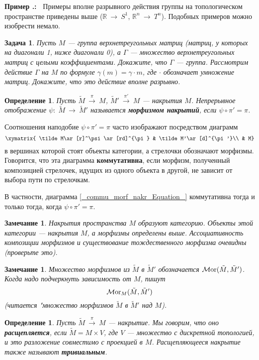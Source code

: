 \documentclass[12pt]{book}
\newcommand{\arrow}{{\:\longrightarrow\:}}
\newcommand{\Mor}{\operatorname{{\cal M}or}}
\def\R{{\mathbb R}}
\theoremstyle{upshape}
\newtheorem{zadacha}{Задача}[chapter]
\theoremstyle{generic}
\newtheorem{opredelenie}[teorema]{Определение}
\newtheorem{remark}[teorema]{Замечание}
\def\замечание{\begin{remark}}
\def\еза{\end{remark}}
\theoremstyle{upshapenonumber}
\newcommand{\следствие}{%
     \refstepcounter{teorema}
     {\noindent\bf Следствие \thechapter.\arabic{teorema}:\ }}
\newcommand{\пример}{%
     \refstepcounter{teorema}
     {\noindent\bf Пример \thechapter.\arabic{teorema}:\ }}
\newcommand{\лемма}{%
     \refstepcounter{teorema}
     {\noindent\bf Лемма \thechapter.\arabic{teorema}:\ }}
\newcommand{\теорема}{%
     \refstepcounter{teorema}
     {\noindent\bf Теорема \thechapter.\arabic{teorema}:\ }}
\newcommand{\утверждение}{%
     \refstepcounter{teorema}
     {\noindent\bf Утверждение \thechapter.\arabic{teorema}:\ }}
\def\бф{\bf}
\def\ем{\em}
\def\задача{\begin{zadacha}}
\def\ез{\end{zadacha}}
\def\еу{\end{ukazanie}}
\def\определение{\begin{opredelenie}}
\def\ео{\end{opredelenie}}
\def\енум{\begin{enumerate}}
\def\ее{\end{enumerate}}
\begin{document}
\hfill

\пример
Примеры вполне разрывного действия группы на 
топологическом пространстве приведены выше
($\R \arrow S^1$, $\R^n \arrow T^n$). Подобных
примеров можно изобрести немало.

\задача
Пусть $M$ --- группа верхнетреугольных матриц
(матриц, у которых на диагонали 1, ниже диагонали 0),
а $\Gamma$ --- множество  верхнетреугольных матриц
с целыми коэффициентами. Докажите, что $\Gamma$ --- группа.
Рассмотрим действие $\Gamma$ на $M$ по формуле
$\gamma(m) = \gamma\cdot m$, где $\cdot$ обозначает
умножение матриц. Докажите, что это действие
вполне разрывно. 
\ез

\определение
Пусть $\tilde M\stackrel \pi \arrow M$, 
$\tilde M'\stackrel {\pi'} \arrow M$ --- накрытия $M$.
Непрерывное отображение $\psi:\; \tilde M \arrow \tilde M'$
называется {\бф морфизмом накрытий}, если
$\psi \circ \pi'=\pi$. 
\ео

Соотношения наподобие $\psi \circ \pi'=\pi$ часто изображают
посредством диаграмм
\begin{equation}\label{_commu_morf_nakr_Equation_}
\xymatrix{
\tilde M\ar[r]^\psi\ar[rd]^{\pi} & \tilde M'\ar[d]^{\pi'}\\
& M}
\end{equation}
в вершинах которой стоят объекты категории,
а стрелочки обозначают морфизмы.
Говорится, что эта диаграмма {\бф коммутативна},
если морфизм, полученный композицией стрелочек,
идущих из одного объекта в другой, не зависит от выбора
пути по стрелочкам.

В частности, диаграмма \eqref{_commu_morf_nakr_Equation_}
коммутативна тогда и только тогда, когда 
$\psi \circ \pi'=\pi$. 


\замечание
Накрытия пространства $M$ образуют категорию. Объекты
этой категории --- накрытия $M$, а морфизмы определены
выше. Ассоциативность композиции морфизмов и существование
тождественного морфизма очевидны (проверьте это).
\еза

\замечание
Множество морфизмов из $\tilde M$ в $\tilde M'$
обозначается $\Mor(\tilde M, \tilde M')$.
Когда надо подчеркнуть зависимость от $M$,
пишут \[ \Mor_M(\tilde M, \tilde M')\]
(читается "множество морфизмов $\tilde M$ в $\tilde M'$
над $M$).
\еза

\определение
Пусть $\tilde M \stackrel \pi \arrow M$ --- накрытие.
Мы говорим, что оно {\бф расщепляется}, если 
$\tilde M = M \times V$, где $V$ --- множество
с дискретной топологией, и это разложение
совместимо с проекцией в $M$. Расщепляющееся
накрытие также называют {\бф тривиальным}.
\ео
\end{document}
